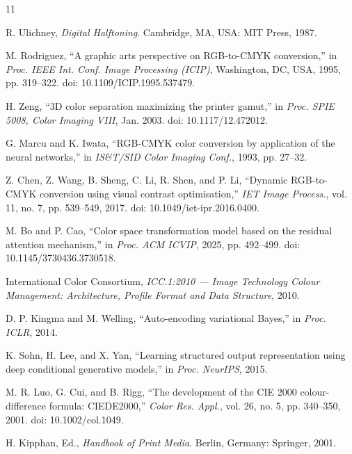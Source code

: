 \documentclass[11pt]{article}
\begin{document}
\begin{thebibliography}{11}

R. Ulichney,
\textit{Digital Halftoning}.
Cambridge, MA, USA: MIT Press, 1987.

M. Rodriguez,
``A graphic arts perspective on RGB-to-CMYK conversion,''
in \textit{Proc. IEEE Int. Conf. Image Processing (ICIP)}, Washington, DC, USA, 1995, pp. 319--322.
doi: 10.1109/ICIP.1995.537479.

H. Zeng,
``3D color separation maximizing the printer gamut,''
in \textit{Proc. SPIE 5008, Color Imaging VIII}, Jan. 2003.
doi: 10.1117/12.472012.

G. Marcu and K. Iwata,
``RGB-CMYK color conversion by application of the neural networks,''
in \textit{IS\&T/SID Color Imaging Conf.}, 1993, pp. 27--32.

Z. Chen, Z. Wang, B. Sheng, C. Li, R. Shen, and P. Li,
``Dynamic RGB-to-CMYK conversion using visual contrast optimisation,''
\textit{IET Image Process.}, vol. 11, no. 7, pp. 539--549, 2017.
doi: 10.1049/iet-ipr.2016.0400.

M. Bo and P. Cao,
``Color space transformation model based on the residual attention mechanism,''
in \textit{Proc. ACM ICVIP}, 2025, pp. 492--499.
doi: 10.1145/3730436.3730518.

International Color Consortium,
\textit{ICC.1:2010 --- Image Technology Colour Management: Architecture, Profile Format and Data Structure},
2010.

D. P. Kingma and M. Welling,
``Auto-encoding variational Bayes,''
in \textit{Proc. ICLR}, 2014.

K. Sohn, H. Lee, and X. Yan,
``Learning structured output representation using deep conditional generative models,''
in \textit{Proc. NeurIPS}, 2015.

M. R. Luo, G. Cui, and B. Rigg,
``The development of the CIE 2000 colour-difference formula: CIEDE2000,''
\textit{Color Res. Appl.}, vol. 26, no. 5, pp. 340--350, 2001.
doi: 10.1002/col.1049.

H. Kipphan, Ed.,
\textit{Handbook of Print Media}.
Berlin, Germany: Springer, 2001.

\end{thebibliography}
\end{document}
